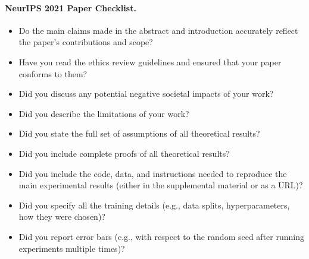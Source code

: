 \paragraph{NeurIPS 2021 Paper Checklist.}

\begin{itemize}
    \item 
    Do the main claims made in the abstract and introduction accurately reflect the paper's contributions and scope?
    
    
    \item
    Have you read the ethics review guidelines and ensured that your paper conforms to them?
    
    \answerYes{}
    
    \item
    Did you discuss any potential negative societal impacts of your work?
    
    \answerTODO{}
    
    \item
    Did you describe the limitations of your work?
    
    
    \item
    Did you state the full set of assumptions of all theoretical results?
    
    
    \item
    Did you include complete proofs of all theoretical results?
    
    
    \item
    Did you include the code, data, and instructions needed to reproduce the main experimental results (either in the supplemental material or as a URL)?
    
    \answerTODO{}
    
    \item
    Did you specify all the training details (e.g., data splits, hyperparameters, how they were chosen)?
    
    
    \item
    Did you report error bars (e.g., with respect to the random seed after running experiments multiple times)?
    

\end{itemize}
